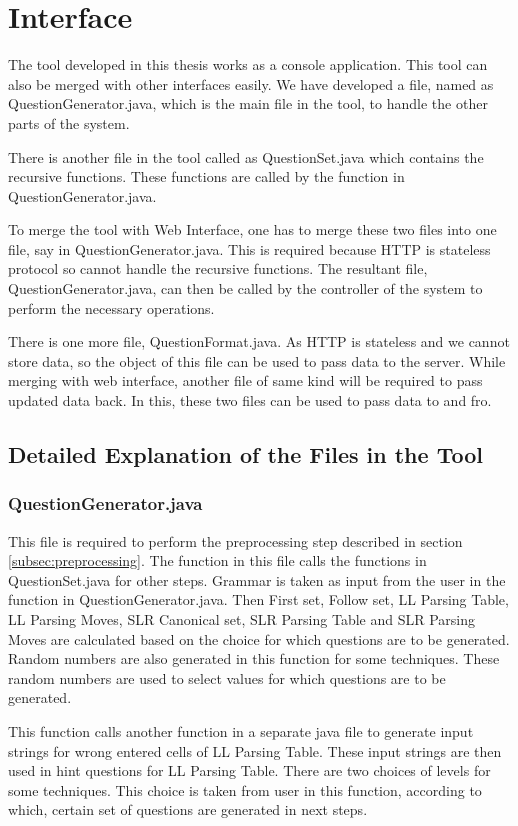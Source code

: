 \chapter{Interface}
\label{interface}

The tool developed in this thesis works as a console application. This tool can also be merged with other interfaces easily. We have developed a file, named as QuestionGenerator.java, which is the main file in the tool, to handle the other parts of the system.

There is another file in the tool called as QuestionSet.java which contains the recursive functions. These functions are called by the function in QuestionGenerator.java.

To merge the tool with Web Interface, one has to merge these two files into one file, say in QuestionGenerator.java. This is required because  HTTP is stateless protocol so cannot handle the recursive functions. The resultant file, QuestionGenerator.java, can then be called by the controller of the system to perform the necessary operations.

There is one more file, QuestionFormat.java. As HTTP is stateless and we cannot store data, so the object of this file can be used to pass data to the server. While merging with web interface, another file of same kind will be required to pass updated data back. In this, these two files can be used to pass data to and fro.

\section{Detailed Explanation of the Files in the Tool}
\subsection{QuestionGenerator.java}
This file is required to perform the preprocessing step described in section \ref{subsec:preprocessing}. The function in this file calls the functions in QuestionSet.java for other steps. Grammar is taken as input from the user in the function in QuestionGenerator.java. Then First set, Follow set, LL Parsing Table, LL Parsing Moves, SLR Canonical set, SLR Parsing Table and SLR Parsing Moves are calculated based on the choice for which questions are to be generated. Random numbers are also generated in this function for some techniques. These random numbers are used to select values for which questions are to be generated.

This function calls another function in a separate java file to generate input strings for wrong entered cells of LL Parsing Table. These input strings are then used in hint questions for LL Parsing Table. There are two choices of levels for some techniques. This choice is taken from user in this function, according to which, certain set of questions are generated in next steps.

